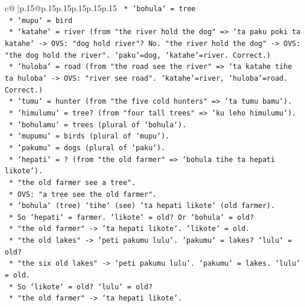 \documentclass{article}
\begin{document}
{\begin{supertabular}{c@{$\;$}|p{.15\linewidth}@{}p{.15\linewidth}p{.15\linewidth}p{.15\linewidth}p{.15\linewidth}p{.15\linewidth}}
{{{\texttt{                    *   `bohula` = tree} \\
\texttt{                    *   `mupu` = bird} \\
\texttt{                    *   `katahe` = river (from "the river hold the dog" => `ta paku poki ta katahe` {-}> OVS: "dog hold river"? No. "the river hold the dog" {-}> OVS: "the dog hold the river". `paku`=dog, `katahe`=river. Correct.)} \\
\texttt{                    *   `huloba` = road (from "the road see the river" => `ta katahe tihe ta huloba` {-}> OVS: "river see road". `katahe`=river, `huloba`=road. Correct.)} \\
\texttt{                    *   `tumu` = hunter (from "the five cold hunters" => `ta tumu bamu`).} \\
\texttt{                    *   `himulumu` = tree? (from "four tall trees" => `ku leho himulumu`).} \\
\texttt{                    *   `bohulamu` = trees (plural of `bohula`).} \\
\texttt{                    *   `mupumu` = birds (plural of `mupu`).} \\
\texttt{                    *   `pakumu` = dogs (plural of `paku`).} \\
\texttt{                    *   `hepati` = ? (from "the old farmer" => `bohula tihe ta hepati likote`).} \\
\texttt{                        *   "the old farmer see a tree".} \\
\texttt{                        *   OVS: "a tree see the old farmer".} \\
\texttt{                        *   `bohula` (tree) `tihe` (see) `ta hepati likote` (old farmer).} \\
\texttt{                        *   So `hepati` = farmer. `likote` = old? Or `bohula` = old?} \\
\texttt{                        *   "the old farmer" {-}> `ta hepati likote`. `likote` = old.} \\
\texttt{                        *   "the old lakes" {-}> `peti pakumu lulu`. `pakumu` = lakes? `lulu` = old?} \\
\texttt{                        *   "the six old lakes" {-}> `peti pakumu lulu`. `pakumu` = lakes. `lulu` = old.} \\
\texttt{                        *   So `likote` = old? `lulu` = old?} \\
\texttt{                        *   "the old farmer" {-}> `ta hepati likote`.} \\
}}}
\end{supertabular}}
\end{document}
